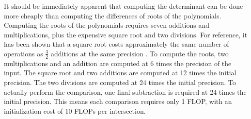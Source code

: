 \documentclass{cccg16}
\begin{document}
It should be immediately apparent that computing the determinant can
be done more cheaply than computing the differences of roots of the
polynomials.  Computing the roots of the polynomials requires seven
additions and multiplications, plus the expensive square root and two
divisions.  For reference, it has been shown that a square root costs
approximately the same number of operations as $\frac{3}{2}$ additions
at the same precision \cite{karatsuba}.  To compute the roots, two
multiplications and an addition are computed at 6 times the precision
of the input.  The square root and two additions are computed at 12
times the initial precision.  The two divisions are computed at 24
times the initial precision.  To actually perform the comparison, one
final subtraction is required at 24 times the initial precision. This
means each comparison requires only 1 FLOP, with an initialization
cost of 10 FLOPs per intersection.
\end{document}
